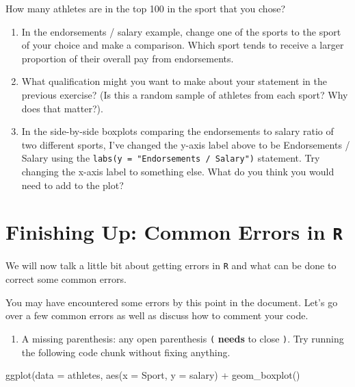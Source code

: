\documentclass[
]{book}
\newenvironment{Shaded}{\begin{snugshade}}{\end{snugshade}}
\newcommand{\AttributeTok}[1]{\textcolor[rgb]{0.77,0.63,0.00}{#1}}
\newcommand{\FunctionTok}[1]{\textcolor[rgb]{0.00,0.00,0.00}{#1}}
\newcommand{\NormalTok}[1]{#1}
\newcommand{\SpecialCharTok}[1]{\textcolor[rgb]{0.00,0.00,0.00}{#1}}
\providecommand{\tightlist}{%
  \setlength{\itemsep}{0pt}\setlength{\parskip}{0pt}}
\begin{document}
How many athletes are in the top 100 in the sport that you chose?

\begin{enumerate}
\def\labelenumi{\arabic{enumi}.}
\setcounter{enumi}{2}
\item
  In the endorsements / salary example, change one of the sports to the sport of your choice and make a comparison. Which sport tends to receive a larger proportion of their overall pay from endorsements.
\item
  What qualification might you want to make about your statement in the previous exercise? (Is this a random sample of athletes from each sport? Why does that matter?).
\item
  In the side-by-side boxplots comparing the endorsements to salary ratio of two different sports, I've changed the y-axis label above to be Endorsements / Salary using the \texttt{labs(y\ =\ "Endorsements\ /\ Salary")} statement. Try changing the x-axis label to something else. What do you think you would need to add to the plot?
\end{enumerate}

\hypertarget{finishing-up-common-errors-in-r}{%
\section{\texorpdfstring{Finishing Up: Common Errors in \texttt{R}}{Finishing Up: Common Errors in R}}\label{finishing-up-common-errors-in-r}}

We will now talk a little bit about getting errors in \texttt{R} and what can be done to correct some common errors.

You may have encountered some errors by this point in the document. Let's go over a few common errors as well as discuss how to comment your code.

\begin{enumerate}
\def\labelenumi{\arabic{enumi}.}
\tightlist
\item
  A missing parenthesis: any open parenthesis \texttt{(} \textbf{needs} to close \texttt{)}. Try running the following code chunk without fixing anything.
\end{enumerate}

\begin{Shaded}
\begin{Highlighting}[]
\FunctionTok{ggplot}\NormalTok{(}\AttributeTok{data =}\NormalTok{ athletes, }\FunctionTok{aes}\NormalTok{(}\AttributeTok{x =}\NormalTok{ Sport, }\AttributeTok{y =}\NormalTok{ salary) }\SpecialCharTok{+} 
  \FunctionTok{geom\_boxplot}\NormalTok{()}
\end{Highlighting}
\end{Shaded}
\end{document}
